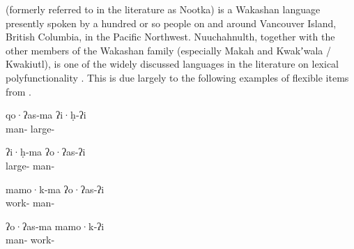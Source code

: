  (formerly referred to in the literature as Nootka) is a Wakashan language presently spoken by a hundred or so people on and around Vancouver Island, British Columbia, in the Pacific Northwest. Nuuchahnulth, together with the other members of the Wakashan family (especially Makah and Kwakʼwala / Kwakiutl), is one of the widely discussed languages in the literature on lexical polyfunctionality \parencites{Swadesh1939b}{Jacobsen1979}{Braithwaite2015}. This is due largely to the following examples of flexible items from \textcite{Swadesh1939b}.

\begin{exe}

  \ex\label{ex:1.8}
  \begin{xlist}

    \ex
    \gll qo·ʔas‑ma        ʔi·ḥ‑ʔi\\
         man‑ large‑\\

    \ex
    \gll ʔi·ḥ‑ma            ʔo·ʔas‑ʔi\\
         large‑ man‑\\

  \end{xlist}

  \ex\label{ex:1.9}
  \begin{xlist}

    \ex
    \gll mamo·k‑ma         ʔo·ʔas‑ʔi\\
         work‑ man‑\\

    \ex
    \gll ʔo·ʔas‑ma        mamo·k‑ʔi\\
         man‑ work‑\\

  \end{xlist}

\end{exe}

